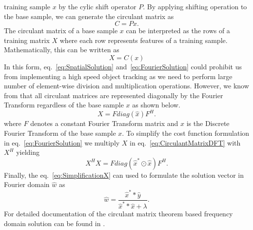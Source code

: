 \documentclass[10pt,twocolumn,letterpaper]{article}
\newcounter{ct}
\begin{document}
training sample $x$ by the cylic shift operator $P$. By applying
shifting operation to the base sample, we can generate the circulant
matrix as
\begin{equation}
C = Px.
\label{eq:CirculantMatrixGeneration}
\end{equation}
The circulant matrix of a base sample $x$ can be interpreted as the
rows of a training matrix $X$ where each row represents features of a
training sample. Mathematically, this can be written as
\begin{equation}
X = C(x)
\label{eq:CIrculantMatrixTrainingData}
\end{equation}
In this form, eq.~\ref{eq:SpatialSolution}
and~\ref{eq:FourierSolution} could prohibit us from implementing a
high speed object tracking as we need to perform large number of
element-wise division and multiplication operations. However, we know
from \cite{gray2006toeplitz} that all circulant matrices are
represented diagonally by the Fourier Transform regardless of the base
sample $x$ as shown below.
\begin{equation}
X = Fdiag(\hat{x})F^{H}.
\label{eq:CirculantMatrixDFT}
\end{equation}
where $F$ denotes a constant Fourier Transform matrix and $x$ is the
Discrete Fourier Transform of the base sample $x$. To simplify the
cost function formulation in eq.~\ref{eq:FourierSolution} we multiply
$X$ in eq.~\ref{eq:CirculantMatrixDFT} with $X^{H}$ yielding
\begin{equation}
X^{H}X = Fdiag(\hat{x}^{*}\odot \hat{x})F^{H}.
\label{eq:SimplificationX} 
\end{equation}
Finally, the eq.~\ref{eq:SimplificationX} can used to formulate the
solution vector in Fourier domain $\hat{w}$ as
\begin{equation}
\hat{w} = \dfrac{\hat{x}^{*}*\hat{y}}{\hat{x}^{*}*\hat{x}+\lambda}.
\label{eq:DiagonalizedPrimalSolution}
\end{equation}
For detailed documentation of the circulant matrix theorem based
frequency domain solution can be found in
\cite{henriques2012exploiting,henriques2015high}.
\end{document}
